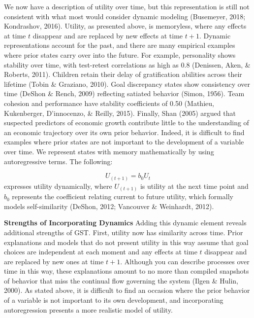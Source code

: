 \documentclass[english,,man]{apa6}
\theoremstyle{definition}
\theoremstyle{definition}
\theoremstyle{definition}
\theoremstyle{remark}
\begin{document}
We now have a description of utility over time, but this representation
is still not consistent with what most would consider dynamic modeling
(Busemeyer, 2018; Kondrashov, 2016). Utility, as presented above, is
memoryless, where any effects at time \(t\) disappear and are replaced
by new effects at time \(t+1\). Dynamic representations account for the
past, and there are many empirical examples where prior states carry
over into the future. For example, personality shows stability over
time, with test-retest correlations as high as 0.8 (Denissen, Aken, \&
Roberts, 2011). Children retain their delay of gratification abilities
across their lifetime (Tobin \& Graziano, 2010). Goal discrepancy states
show consistency over time (DeShon \& Rench, 2009) reflecting satiated
behavior (Simon, 1956). Team cohesion and performance have stability
coefficients of 0.50 (Mathieu, Kukenberger, D'innocenzo, \& Reilly,
2015). Finally, Shan (2005) argued that suspected predictors of economic
growth contribute little to the understanding of an economic trajectory
over its own prior behavior. Indeed, it is difficult to find examples
where prior states are not important to the development of a variable
over time. We represent states with memory mathematically by using
autoregressive terms. The following:

\begin{equation}
U_{(t+1)} = b_0 U_{t}
\end{equation} \noindent expresses utility dynamically, where
\(U_{(t+1)}\) is utility at the next time point and \(b_0\) represents
the coefficient relating current to future utility, which formally
models self-similarity (DeShon, 2012; Vancouver \& Weinhardt, 2012).

\textbf{Strengths of Incorporating Dynamics} Adding this dynamic element
reveals additional strengths of GST. First, utility now has similarity
across time. Prior explanations and models that do not present utility
in this way assume that goal choices are independent at each moment and
any effects at time \(t\) disappear and are replaced by new ones at time
\(t+1\). Although you can describe processes over time in this way,
these explanations amount to no more than compiled snapshots of behavior
that miss the continual flow governing the system (Ilgen \& Hulin,
2000). As stated above, it is difficult to find an occasion where the
prior behavior of a variable is not important to its own development,
and incorporating autoregression presents a more realistic model of
utility.
\end{document}
